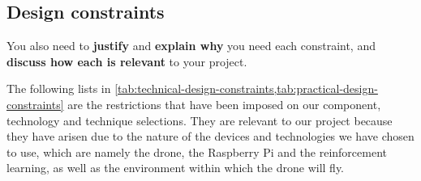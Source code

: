 \documentclass[../main.tex]{subfiles}
\begin{document}
\subsection{Design constraints}

\begin{newrequirements}
    \begin{todolist}
    \item[\done] You also need to \textbf{justify} and 
        \textbf{explain why} you need 
        each constraint, and 
        \textbf{discuss how each is relevant}
        to your project.
    \end{todolist}
\end{newrequirements}

The following lists in 
\cref{tab:technical-design-constraints,tab:practical-design-constraints} 
are the restrictions that have been imposed
on our component, technology and technique selections. 
They are relevant to our project 
because they have arisen due to the nature of 
the devices and technologies we have chosen to use,
which are namely the \anafi drone, the Raspberry Pi
and the reinforcement learning, as well as
the environment within which the drone will fly.
\end{document}
